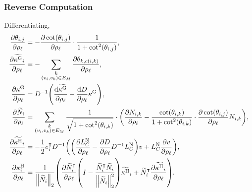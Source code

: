 \subsubsection{Reverse Computation}
Differentiating, \begin{align*}
	\frac{\partial\theta_{i, j}}{\partial\rho_\ell} &= -\frac{\partial\cot\pof{\theta_{i, j}}}{\partial \rho_\ell} \cdot \frac{1}{1 + \cot^2\pof{\theta_{i, j}}}, \\
	\frac{\partial\widetilde{\kappa^\text{G}}_i}{\partial\rho_\ell} &= -\sum_{\substack{k \\ \pof{v_i, v_k} \in E_M}} \frac{\partial\theta_{k, c\pof{i, k}}}{\partial\rho_\ell}, \\
	\frac{\partial\kappa^\text{G}}{\partial\rho_\ell} &= D^{-1}\pof{\frac{\dif\widetilde{\kappa^\text{G}}}{\partial\rho_\ell} - \frac{\dif D}{\partial\rho_\ell}\kappa^\text{G}}, \\
	\frac{\partial\widetilde{N}_i}{\partial\rho_\ell} &= \sum_{\substack{k \\ \pof{v_i, v_k} \in E_M}} \frac{1}{\sqrt{1 + \cot^2\pof{\theta_{i, k}}}} \cdot \pof{\frac{\partial N_{i, k}}{\partial\rho_\ell} - \frac{\cot\pof{\theta_{i, k}}}{1 + \cot^2\pof{\theta_{i, k}}} \cdot \frac{\partial\cot\pof{\theta_{i, j}}}{\partial \rho_\ell}N_{i, k}}, \\
	\frac{\partial\widetilde{\kappa^\text{H}}_i}{\partial\rho_\ell} &= -\frac{1}{2}e_i^\intercal D^{-1}\pof{\pof{\frac{\partial L_C^{\text{N}}}{\partial\rho_\ell} - \frac{\partial D}{\partial\rho_\ell}D^{-1}L_C^{\text{N}}}v + L_C^{\text{N}}\frac{\partial v}{\partial\rho_\ell}}, \\
	\frac{\partial\kappa_i^\text{H}}{\partial\rho_\ell} &= \frac{1}{\norm{\widetilde{N}_i}_2}\pof{\frac{\partial\widetilde{N}_i^\intercal}{\partial\rho_\ell}\pof{I - \frac{\widetilde{N}_i^\intercal\widetilde{N}_i}{\norm{\widetilde{N}_i}_2^2}}\widetilde{\kappa^\text{H}}_i + \widetilde{N}_i^\intercal\frac{\partial\widetilde{\kappa^\text{H}}_i}{\partial\rho_\ell}}.
\end{align*}
